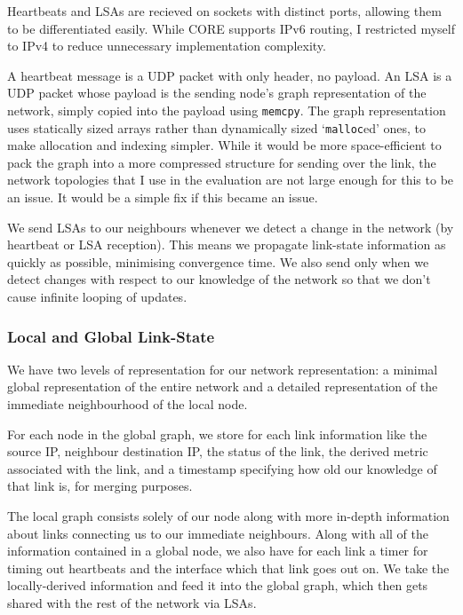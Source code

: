 \documentclass[10pt,twoside,a4paper]{article}
\begin{document}
Heartbeats and LSAs are recieved on sockets with distinct ports, allowing them to be differentiated easily. While CORE supports IPv6 routing, I restricted myself to IPv4 to reduce unnecessary implementation complexity.

A heartbeat message is a UDP packet with only header, no payload. An LSA is a UDP packet whose payload is the sending node's graph representation of the network, simply copied into the payload using \texttt{memcpy}. The graph representation uses statically sized arrays rather than dynamically sized `\texttt{malloc}ed' ones, to make allocation and indexing simpler. While it would be more space-efficient to pack the graph into a more compressed structure for sending over the link, the network topologies that I use in the evaluation are not large enough for this to be an issue. It would be a simple fix if this became an issue.

We send LSAs to our neighbours whenever we detect a change in the network (by heartbeat or LSA reception). This means we propagate link-state information as quickly as possible, minimising convergence time. We also send only when we detect changes with respect to our knowledge of the network so that we don't cause infinite looping of updates.

\subsubsection{Local and Global Link-State}

We have two levels of representation for our network representation: a minimal global representation of the entire network and a detailed representation of the immediate neighbourhood of the local node.

For each node in the global graph, we store for each link information like the source IP, neighbour destination IP, the status of the link, the derived metric associated with the link, and a timestamp specifying how old our knowledge of that link is, for merging purposes.

The local graph consists solely of our node along with more in-depth information about links connecting us to our immediate neighbours. Along with all of the information contained in a global node, we also have for each link a timer for timing out heartbeats and the interface which that link goes out on. We take the locally-derived information and feed it into the global graph, which then gets shared with the rest of the network via LSAs.
\end{document}
